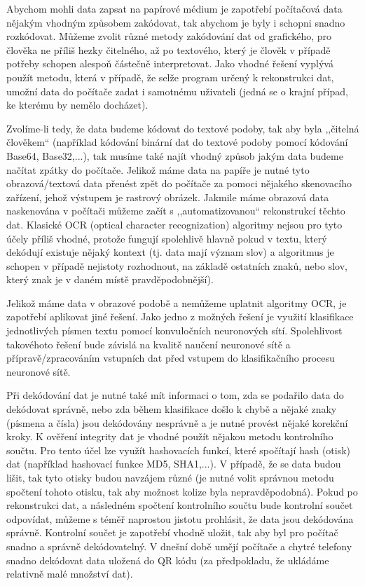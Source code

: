 \documentclass[conference]{IEEEtran}
\begin{document}
Abychom mohli data zapsat na papírové médium je zapotřebí počítačová data nějakým vhodným způsobem zakódovat, tak abychom je byly i schopni snadno rozkódovat. Můžeme zvolit různé metody zakódování dat od grafického, pro člověka ne příliš hezky čitelného, až po textového, který je člověk v případě potřeby schopen alespoň částečně interpretovat. Jako vhodné řešení vyplývá použít metodu, která v případě, že selže program určený k rekonstrukci dat, umožní data do počítače zadat i samotnému uživateli (jedná se o krajní případ, ke kterému by nemělo docházet). 

Zvolíme-li tedy, že data budeme kódovat do textové podoby, tak aby byla ,,čitelná člověkem`` (například kódování binární dat do textové podoby pomocí kódování Base64, Base32,...), tak musíme také najít vhodný způsob jakým data budeme načítat zpátky do počítače. Jelikož máme data na papíře je nutné tyto obrazová/textová data přenést zpět do počítače za pomoci nějakého skenovacího zařízení, jehož výstupem je rastrový obrázek. Jakmile máme obrazová data naskenována v počítači můžeme začít s ,,automatizovanou`` rekonstrukcí těchto dat. Klasické OCR (optical character recognization) algoritmy nejsou pro tyto účely příliš vhodné, protože fungují spolehlivě hlavně pokud v textu, který dekódují existuje nějaký kontext (tj. data mají význam slov) a algoritmus je schopen v případě nejistoty rozhodnout, na základě ostatních znaků, nebo slov, který znak je v daném místě pravděpodobnější).

Jelikož máme data v obrazové podobě a nemůžeme uplatnit algoritmy OCR, je zapotřebí aplikovat jiné řešení. Jako jedno z možných řešení je využití klasifikace jednotlivých písmen textu pomocí konvuločních neuronových sítí. Spolehlivost takovéhoto řešení bude závislá na kvalitě naučení neuronové sítě a přípravě/zpracováním vstupních dat před vstupem do klasifikačního procesu neuronové sítě.

Při dekódování dat je nutné také mít informaci o tom, zda se podařilo data do dekódovat správně, nebo zda během klasifikace došlo k chybě a nějaké znaky (písmena a čísla) jsou dekódovány nesprávně a je nutné provést nějaké korekční kroky. K ověření integrity dat je vhodné použít nějakou metodu kontrolního součtu. Pro tento účel lze využít hashovacích funkcí, které spočítají hash (otisk) dat (například hashovací funkce MD5, SHA1,...). V případě, že se data budou lišit, tak tyto otisky budou navzájem různé (je nutné volit správnou metodu spočtení tohoto otisku, tak aby možnost kolize byla nepravděpodobná). Pokud po rekonstrukci dat, a následném spočtení kontrolního součtu bude kontrolní součet odpovídat, můžeme s téměř naprostou jistotu prohlásit, že data jsou dekódována správně. Kontrolní součet je zapotřebí vhodně uložit, tak aby byl pro počítač snadno a správně dekódovatelný. V dnešní době umějí počítače a chytré telefony snadno dekódovat data uložená do QR kódu (za předpokladu, že ukládáme relativně malé množství dat).
\end{document}
